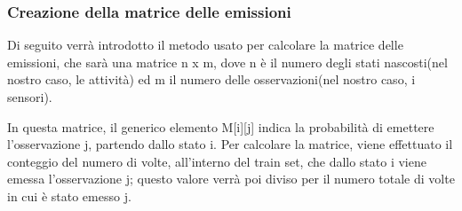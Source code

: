 \documentclass[10pt,a4paper]{article}
\begin{document}
\subsubsection{Creazione della matrice delle emissioni}
Di seguito verrà introdotto il metodo usato per calcolare la matrice delle emissioni, che sarà una matrice  n x m, dove n è il numero degli stati nascosti(nel nostro caso, le attività) ed m il numero delle osservazioni(nel nostro caso, i sensori).

In questa matrice, il generico elemento M[i][j] indica la probabilità di emettere l'osservazione j, partendo dallo stato i. Per calcolare la matrice, viene effettuato il conteggio del numero di volte, all'interno del train set, che dallo stato i viene emessa l'osservazione j; questo valore verrà poi diviso per il numero totale di volte in cui è stato emesso j.
\end{document}
